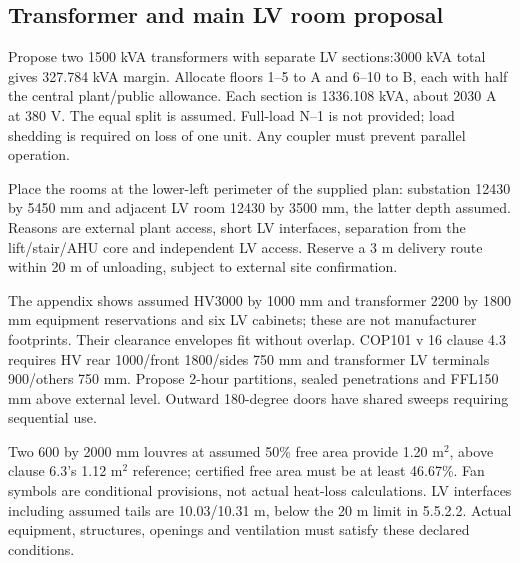 \subsection*{Transformer and main LV room proposal}
Propose two 1500 kVA transformers with separate LV sections:3000 kVA total gives 327.784 kVA margin. Allocate floors 1--5 to A and 6--10 to B, each with half the central plant/public allowance. Each section is 1336.108 kVA, about 2030 A at 380 V. The equal split is assumed. Full-load N--1 is not provided;  load shedding is required on loss of one unit. Any coupler must prevent parallel operation.

Place the rooms at the lower-left perimeter of the supplied plan: substation 12430 by 5450 mm and adjacent LV room 12430 by 3500 mm, the latter depth assumed. Reasons are external plant access, short LV interfaces, separation from the lift/stair/AHU core and independent LV access. Reserve a 3 m delivery route within 20 m of unloading, subject to external site confirmation.

The appendix shows assumed HV3000 by 1000 mm and transformer 2200 by 1800 mm equipment reservations and six LV cabinets;  these are not manufacturer footprints. Their clearance envelopes fit without overlap. COP101 v 16 clause 4.3 requires HV rear 1000/front 1800/sides 750 mm and transformer LV terminals 900/others 750 mm. Propose 2-hour partitions, sealed penetrations and FFL150 mm above external level. Outward 180-degree doors have shared sweeps requiring sequential use.

Two 600 by 2000 mm louvres at assumed 50\% free area provide 1.20 m$^2$, above clause 6.3's 1.12 m$^2$ reference;  certified free area must be at least 46.67\%. Fan symbols are conditional provisions, not actual heat-loss calculations. LV interfaces including assumed tails are 10.03/10.31 m, below the 20 m limit in 5.5.2.2. Actual equipment, structures, openings and ventilation must satisfy these declared conditions.
